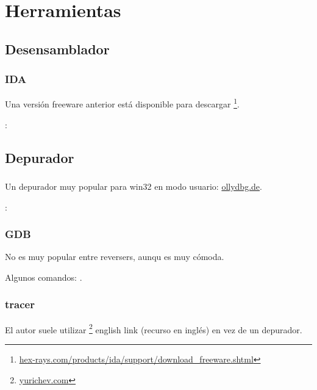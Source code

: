 \part{Herramientas}

\chapter{Desensamblador}

\section{IDA}

\label{IDA}
Una versi\'on freeware anterior est\'a disponible para descargar
\footnote{\href{http://go.yurichev.com/17031}{hex-rays.com/products/ida/support/download\_freeware.shtml}}.

\ShortHotKeyCheatsheet: 

\chapter{Depurador}

\section{\olly}
\myindex{\olly}

Un depurador muy popular para win32 en modo usuario: \href{http://go.yurichev.com/17032}{ollydbg.de}.

\ShortHotKeyCheatsheet: 

\section{GDB}

No es muy popular entre reversers, aunqu es muy c\'omoda. %

Algunos comandos: .

\section{tracer}

\label{tracer}
El autor suele utilizar 
\footnote{\href{http://go.yurichev.com/17338}{yurichev.com}} english link
(recurso en ingl\'es) en vez de un depurador.%

